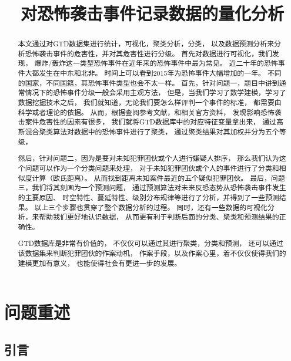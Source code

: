 \documentclass[bwprint]{gmcmthesis}
\title{对恐怖袭击事件记录数据的量化分析}
\begin{document}
 \maketitle

\begin{abstract}

本文通过对GTD数据集进行统计，可视化，聚类分析，分类，
以及数据预测分析来分析恐怖袭击事件的危害性，并对其危害性进行分级。
首先对数据进行可视化，我们发现，
爆炸/轰炸这一类型恐怖事件在近年来的恐怖事件中最为常见。
近二十年的恐怖事件大都发生在中东和北非。
时间上可以看到2015年为恐怖事件大幅增加的一年。
不同的国家，不同国籍，其恐怖事件类型也会不太一样。
首先，针对问题一，题目中讲到通常情况下的恐怖事件分级一般会采用主观方法，
但是，当我们学习了数学建模，学习了数据挖掘技术之后，
我们就知道，无论我们要怎么样评判一个事件的标准，
都需要由科学或者理论的依据。
从而，根据查阅参考文献，和相关官方资料，
发现影响恐怖袭击案件危害性的因素有很多，
我们就将GTD数据库中的对应特征变量拿出来，
通过高斯混合聚类算法对数据中的恐怖事件进行了聚类，
通过聚类结果对其加权并分为五个等级，

然后，针对问题二，因为是要对未知犯罪团伙或个人进行嫌疑人排序，
那么我们认为这个问题可以作为一个分类问题来处理，
对于未知犯罪团伙或个人的事件进行了分类和相似度计算（欧氏距离）。
从而找到距离未知案件最近的五个疑似犯罪团伙。
最后，问题三，我们将其刻画为一个预测问题，
通过预测算法对未来反恐态势从恐怖袭击事件发生的主要原因、
时空特性、蔓延特性、级别分布规律等进行了分析，并得到了一些预测结果。
以上三个步骤也贯穿了整个数据分析的过程。
同时，还有一些数据的可视化分析，来帮助我们更好地认识数据，
从而更有利于判断后面的分类、聚类和预测结果的正确性。

GTD数据库是非常有价值的，
不仅仅可以通过其进行聚类，分类和预测，
还可以通过该数据集来判断犯罪团伙的作案动机，
作案手段，以及作案心里，着不仅仅使得我们的建模更加有意义，
也能使得社会有更进一步的发展。

\end{abstract}

\pagestyle{plain}

\tableofcontents


\newpage
\section{问题重述}

\subsection{引言}
\end{document}
